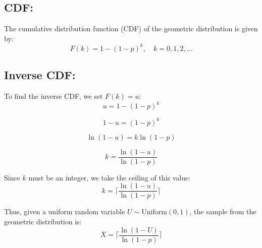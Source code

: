 \documentclass{article}
\begin{document}
\subsection*{CDF:}
The cumulative distribution function (CDF) of the geometric distribution is given by:
\[
F(k) = 1 - (1 - p)^k, \quad k = 0, 1, 2, \ldots
\]

\subsection*{Inverse CDF:}
To find the inverse CDF, we set \( F(k) = u \):
\[
u = 1 - (1 - p)^k
\]

\[
1 - u = (1 - p)^k
\]

\[
\ln(1 - u) = k \ln(1 - p)
\]

\[
k = \frac{\ln(1 - u)}{\ln(1 - p)}
\]

Since \(k\) must be an integer, we take the ceiling of this value:
\[
k = \lceil \frac{\ln(1 - u)}{\ln(1 - p)} \rceil
\]

Thus, given a uniform random variable \( U \sim \text{Uniform}(0, 1) \), the sample from the geometric distribution is:
\[
X = \lceil \frac{\ln(1 - U)}{\ln(1 - p)} \rceil
\]
\end{document}
